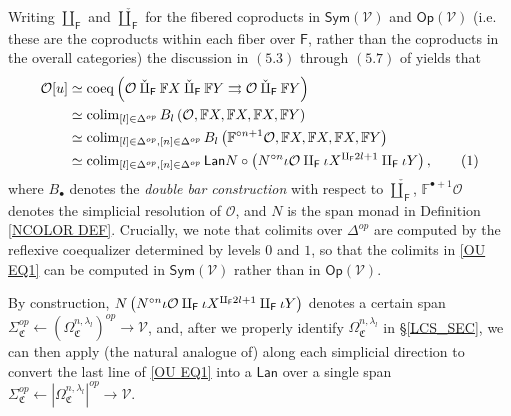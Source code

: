 \documentclass[a4paper,10pt
,draft
]{article}%
\renewcommand{\1}{\eta}%
\begin{document}
Writing $\amalg_{\mathsf{F}}$ and $\mathbin{\check\amalg}_{\mathsf{F}}$
for the fibered coproducts in 
$\mathsf{Sym}(\mathcal{V})$ and
$\mathsf{Op}(\mathcal{V})$
(i.e. these are the coproducts within each fiber over $\mathsf{F}$, rather than the coproducts in the overall categories)
the discussion in $(5.3)$ through $(5.7)$ of \cite{BP_geo}
yields that
\begin{align*}
  \O[u]
  &
    \simeq \mathrm{coeq}\left(
          \O \mathbin{\check\amalg_{\mathsf{F}}} \mathbb F X \mathbin{\check\amalg}_{\mathsf{F}} \mathbb F Y \rightrightarrows \O \mathbin{\check\amalg}_{\mathsf{F}} \mathbb F Y
          \right)
  \\
  &
    \simeq \colim_{[l] \in \Delta^{op}} 
    B_l \left( \O, \mathbb F X, \mathbb F X, \mathbb F X, \mathbb FY \right)
  \\
  &
    \simeq \colim_{[l] \in \Delta^{op},[n] \in \Delta^{op}} 
    B_l \left( \mathbb F^{\circ n+1} \O, \mathbb F X, \mathbb F X, \mathbb F X, \mathbb FY \right)
  \\
  &
    \simeq \colim_{[l] \in \Delta^{op},[n] \in \Delta^{op}} 
    \mathsf{Lan} N \circ \left( N^{\circ n} \iota \O \amalg_{\mathsf{F}} \iota X^{\amalg_{\mathsf{F}} 2l +1} \amalg_{\mathsf{F}} \iota Y \right),
    \stepcounter{equation}\tag{\theequation}\label{OU EQ1}
\end{align*}
where $B_{\bullet}$ denotes the \textit{double bar construction}
with respect to $\mathbin{\check\amalg}_{\mathsf{F}}$,
$\mathbb{F}^{\bullet +1} \mathcal{O}$ denotes the simplicial resolution of $\mathcal{O}$, 
and $N$ is the span monad in Definition \ref{NCOLOR DEF}.
Crucially, we note that colimits over $\Delta^{op}$
are computed by the reflexive coequalizer determined by levels $0$ and $1$, 
so that the colimits in \eqref{OU EQ1}
can be computed in $\mathsf{Sym}(\mathcal{V})$
rather than in $\mathsf{Op}(\mathcal{V})$.


By construction,
$N \left(N^{\circ n} \iota \mathcal{O} \amalg_{\mathsf{F}} \iota X^{\amalg_{\mathsf{F}} 2l +1}\amalg_{\mathsf{F}} \iota Y \right)$
denotes a certain span
$\Sigma_{\mathfrak{C}}^{op} \leftarrow 
\left(\Omega^{n,\lambda_l}_{\mathfrak{C}}\right)^{op} \to \mathcal{V}$,
and, after we properly identify $\Omega_{\mathfrak C}^{n, \lambda_l}$ in \S \ref{LCS_SEC},
we can then apply (the natural analogue of)
\cite[Prop. 5.37]{BP_geo}
along each simplicial direction
to convert the last line of \eqref{OU EQ1}
into a $\mathsf{Lan}$
over a single span
$\Sigma_{\mathfrak{C}}^{op} \leftarrow 
\left|\Omega^{n,\lambda_l}_{\mathfrak{C}}\right|^{op} \to \mathcal{V}$.
\end{document}
